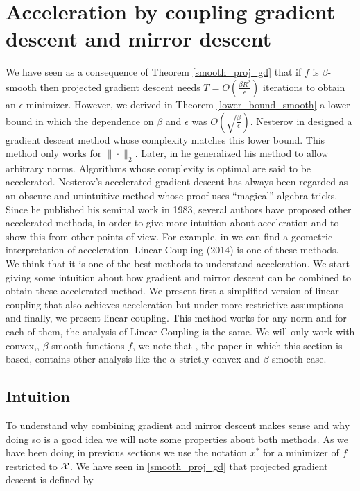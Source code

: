 
\chapter{Acceleration by coupling gradient descent and mirror descent}
We have seen as a consequence of Theorem \ref{smooth_proj_gd} that if $f$ is $\beta$-smooth then projected gradient descent needs $T = O\left( \frac{\beta R^2}{\epsilon}\right)$ iterations to obtain an $\epsilon$-minimizer. However, we derived in Theorem \ref{lower_bound_smooth} a lower bound in which the dependence on $\beta$ and $\epsilon$ was $O\left(\sqrt{\frac{\beta}{\epsilon}}\right)$. Nesterov in \cite{nesterov1983method} designed a gradient descent method whose complexity matches this lower bound. This method only works for $\|{\cdot}\|_2$. Later, in \cite{nesterov2005smooth} he generalized his method to allow arbitrary norms. Algorithms whose complexity is optimal are said to be accelerated. Nesterov's accelerated gradient descent has always been regarded as an obscure and unintuitive method whose proof uses ``magical'' algebra tricks. Since he published his seminal work in 1983, several authors have proposed other accelerated methods, in order to give more intuition about acceleration and to show this from other points of view. For example, in \cite{bubeck} we can find a geometric interpretation of acceleration. Linear Coupling \cite{linearcoupling} (2014) is one of these methods. We think that it is one of the best methods to understand acceleration. We start giving some intuition about how gradient and mirror descent can be combined to obtain these accelerated method. We present first a simplified version of linear coupling that also achieves acceleration but under more restrictive assumptions and finally, we present linear coupling. This method works for any norm and for each of them, the analysis of Linear Coupling is the same. We will only work with convex,, $\beta$-smooth functions $f$, we note that \cite{linearcoupling}, the paper in which this section is based, contains other analysis like the $\alpha$-strictly convex and $\beta$-smooth case.

\section{Intuition}

To understand why combining gradient and mirror descent makes sense and why doing so is a good idea we will note some properties about both methods. As we have been doing in previous sections we use the notation $x^\ast$ for a minimizer of $f$ restricted to $\mathcal{X}$. We have seen in \ref{smooth_proj_gd} that projected gradient descent is defined by


